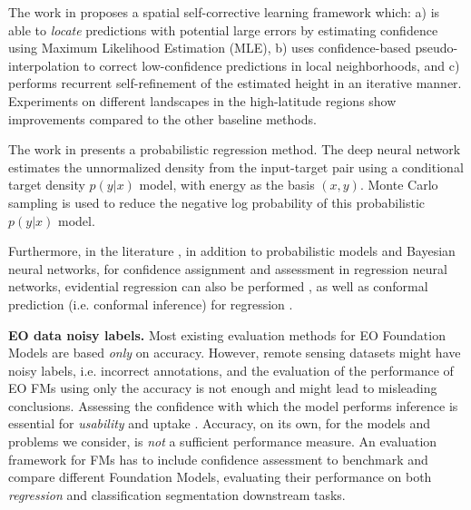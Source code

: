 The work in \cite{newregression1} proposes a spatial self-corrective learning framework which: a) is able to \textit{locate}     predictions with potential large errors by estimating confidence using Maximum Likelihood Estimation (MLE), b) uses confidence-based pseudo-interpolation to correct low-confidence predictions in local neighborhoods, and c) performs recurrent self-refinement of the estimated height in an iterative manner.
Experiments on different landscapes in the high-latitude regions show improvements compared to the other baseline methods.


The work in \cite{newregression2} 
presents a probabilistic regression method. 
The deep neural network estimates the unnormalized density from the input-target pair using a conditional target density $p(y|x)$ model, with energy as the basis $(x, y)$. 
Monte Carlo sampling is used to reduce the negative log probability of this probabilistic $p(y|x)$ model. 



Furthermore, in the literature \cite{newregression2, regressiontousenewuse, regressiontousenovel1, regressiontousenovel2}, in addition to probabilistic models and Bayesian neural networks, for confidence assignment and assessment in regression neural networks, evidential regression can also be performed \cite{regreesssiioonn1, regreesssiioonn2, regreesssiioonn3}, as well as conformal prediction (i.e. conformal inference) for regression \cite{reeggrreesssiioonn1, reeggrreesssiioonn2}.



\textbf{EO data noisy labels.}        
Most existing evaluation methods for EO Foundation Models \cite{Prithvi1, paperTerraMindIBM} are based \textit{only} on accuracy.              
However, remote sensing datasets might have noisy labels,  
i.e. incorrect annotations,   
and the evaluation of the performance of EO FMs using only the accuracy  
is not enough and might lead to misleading conclusions.   
Assessing the confidence with which the model performs inference is essential for \textit{usability} and uptake \cite{regressiioonn, SKondylatosPaper2025}.       
Accuracy, on its own, for the models and problems we consider, is \textit{not} a sufficient performance measure.            
An evaluation framework for FMs has to include confidence assessment to benchmark and compare different Foundation Models, evaluating their performance on both \textit{regression} and classification segmentation downstream tasks.  




